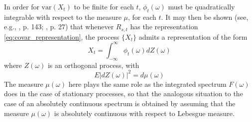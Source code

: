 \documentclass{article}
\begin{document}
In order for $\mathrm{var} (X_t)$ to be finite for each $t$, $\phi_t (\omega)$
must be quadratically integrable with respect to the measure $\mu$, for each
$t$. It may then be shown (see, e.g., {\cite{bartlett1955}}, p. 143;
{\cite{grenander1957}}, p. 27) that whenever $R_{s, t}$ has the representation
\eqref{eq:covar_representation}, the process $\{X_t \}$ admits a
representation of the form
\begin{equation}
  \label{eq:process_rep2} X_t = \int_{- \infty}^{\infty} \phi_t (\omega) dZ
  (\omega)
\end{equation}
where $Z (\omega)$ is an orthogonal process, with
\begin{equation}
  \label{eq:orthogonal_process} E |dZ (\omega) |^2 = d \mu (\omega)
\end{equation}
The measure $\mu (\omega)$ here plays the same role as the integrated spectrum
$F (\omega)$ does in the case of stationary processes, so that the analogous
situation to the case of an absolutely continuous spectrum is obtained by
assuming that the measure $\mu (\omega)$ is absolutely continuous with respect
to Lebesgue measure.
\end{document}
